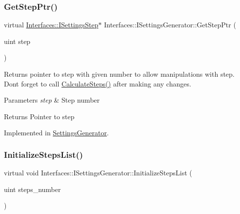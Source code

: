 \subsubsection{\texorpdfstring{Get\+Step\+Ptr()}{GetStepPtr()}}
{\footnotesize\ttfamily virtual \hyperlink{class_interfaces_1_1_i_settings_step}{Interfaces\+::\+I\+Settings\+Step}$\ast$ Interfaces\+::\+I\+Settings\+Generator\+::\+Get\+Step\+Ptr (\begin{DoxyParamCaption}\item[{uint}]{step }\end{DoxyParamCaption})\hspace{0.3cm}{\ttfamily [pure virtual]}}



Returns pointer to step with given number to allow manipulations with step. Don\textquotesingle{}t forget to call \hyperlink{class_interfaces_1_1_i_settings_generator_a7788522bb5d25bfd8b8af430512ec5f5}{Calculate\+Steps()} after making any changes. 


\begin{DoxyParams}{Parameters}
{\em step} & Step number \\
\hline
\end{DoxyParams}
\begin{DoxyReturn}{Returns}
Pointer to step 
\end{DoxyReturn}


Implemented in \hyperlink{class_settings_generator_a37f4175a0ed24853b2f187f15505086b}{Settings\+Generator}.

\mbox{\label{class_interfaces_1_1_i_settings_generator_a4aa0307e906c003012aad75101072c65}} 
\subsubsection{\texorpdfstring{Initialize\+Steps\+List()}{InitializeStepsList()}}
{\footnotesize\ttfamily virtual void Interfaces\+::\+I\+Settings\+Generator\+::\+Initialize\+Steps\+List (\begin{DoxyParamCaption}\item[{uint}]{steps\+\_\+number }\end{DoxyParamCaption})\hspace{0.3cm}{\ttfamily [pure virtual]}}



